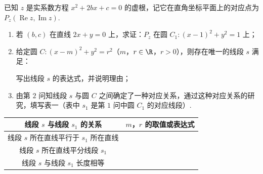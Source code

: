 \begin{problem}
已知 \(z\) 是实系数方程 \(x^2+2bx+c=0\) 的虚根，记它在直角坐标平面上的对应点为 \(P_z(\operatorname{Re} z,\operatorname{Im} z)\).

\begin{enumerate}
\item 若 \((b,c)\) 在直线 \(2x+y=0\) 上，求证：\(P_z\) 在圆 \(C_1:(x-1)^2+y^2=1\) 上；
\item 给定圆 \(C:(x-m)^2+y^2=r^2\)（\(m\)，\(r\in\R\)，\(r>0\)），则存在唯一的线段 \(s\) 满足：


写出线段 \(s\) 的表达式，并说明理由；
\item 由第 \(2\) 问知线段 \(s\) 与圆 \(C\) 之间确定了一种对应关系，通过这种对应关系的研究，填写表一（表中 \(s_1\) 是第 \(1\) 问中圆 \(C_1\) 的对应线段）.
\end{enumerate}

\begin{center}
\begin{tabular}{|c|c|}
\hline
线段 \(s\) 与线段 \(s_1\) 的关系 & \(m\)，\(r\) 的取值或表达式 \\
\hline
线段 \(s\) 所在直线平行于 \(s_1\) 所在直线 & \\
\hline
线段 \(s\) 所在直线平分线段 \(s_1\) & \\
\hline
线段 \(s\) 与线段 \(s_1\) 长度相等 & \\
\hline
\end{tabular}
\end{center}
\end{problem}

